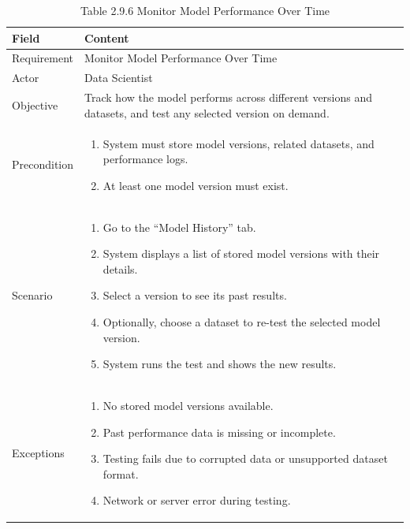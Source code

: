 \documentclass[12pt,oneside]{report}
\begin{document}
\begin{table}[H]
\centering
\caption{Table 2.9.6 Monitor Model Performance Over Time}
\label{tab:ds-monitor-model}
\begin{tabularx}{\textwidth}{|p{3cm}|X|}
\hline
\textbf{Field} & \textbf{Content} \\ \hline

Requirement & Monitor Model Performance Over Time \\ \hline

Actor & Data Scientist \\ \hline

Objective & Track how the model performs across different versions and datasets, and test any selected version on demand. \\ \hline

Precondition & 
\begin{minipage}[t]{0.75\textwidth}
\begin{enumerate}[leftmargin=*,label=\arabic*.]
\item System must store model versions, related datasets, and performance logs.
\item At least one model version must exist.
\end{enumerate}
\end{minipage} \\ \hline

Scenario & 
\begin{minipage}[t]{0.75\textwidth}
\begin{enumerate}[leftmargin=*,label=\arabic*.]
\item Go to the “Model History” tab.
\item System displays a list of stored model versions with their details.
\item Select a version to see its past results.
\item Optionally, choose a dataset to re-test the selected model version.
\item System runs the test and shows the new results.
\end{enumerate}
\end{minipage} \\ \hline

Exceptions & 
\begin{minipage}[t]{0.75\textwidth}
\begin{enumerate}[leftmargin=*,label=\arabic*.]
\item No stored model versions available.
\item Past performance data is missing or incomplete.
\item Testing fails due to corrupted data or unsupported dataset format.
\item Network or server error during testing.
\end{enumerate}
\end{minipage} \\ \hline

\end{tabularx}
\end{table}
\end{document}

